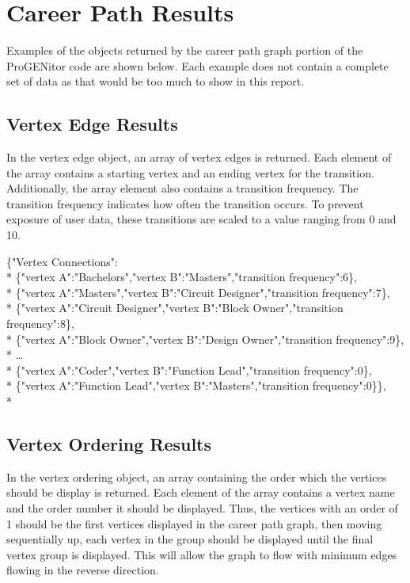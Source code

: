 \section{Career Path Results}
\label{sect:career-path-results}
Examples of the objects returned by the career path graph portion of the
ProGENitor code are shown below.  Each example does not contain a complete set
of data as that would be too much to show in this report.

\subsection{Vertex Edge Results}
In the vertex edge object, an array of vertex edges is returned.  Each element
of the array contains a starting vertex and an ending vertex for the transition. 
Additionally, the array element also contains a transition frequency.  The
transition frequency indicates how often the transition occurs.  To
prevent exposure of user data, these transitions are scaled to a value
ranging from 0 and 10.

\begin{tt}
\begin{footnotesize}
\noindent\{"Vertex Connections":\\*
\{"vertex A":"Bachelors","vertex B":"Masters","transition frequency":6\},\\*
\{"vertex A":"Masters","vertex 	B":"Circuit Designer","transition frequency":7\},\\*
\{"vertex A":"Circuit Designer","vertex B":"Block 	Owner","transition
 frequency":8\},\\* 
\{"vertex A":"Block Owner","vertex B":"Design Owner","transition frequency":9\},\\*
\ldots\\* 
\{"vertex A":"Coder","vertex B":"Function Lead","transition frequency":0\},\\*
\{"vertex A":"Function Lead","vertex B":"Masters","transition frequency":0\}\},\\*
\end{footnotesize}
\end{tt}


\subsection{Vertex Ordering Results}
In the vertex ordering object, an array containing the order which the vertices
should be display is returned.  Each element of the array contains a vertex name
and the order number it should be displayed.  Thus, the vertices with an order
of 1 should be the first vertices displayed in the career path graph, then
moving sequentially up, each vertex in the group should be displayed until the
final vertex group is displayed.  This will allow the graph to flow with minimum
edges flowing in the reverse direction.

